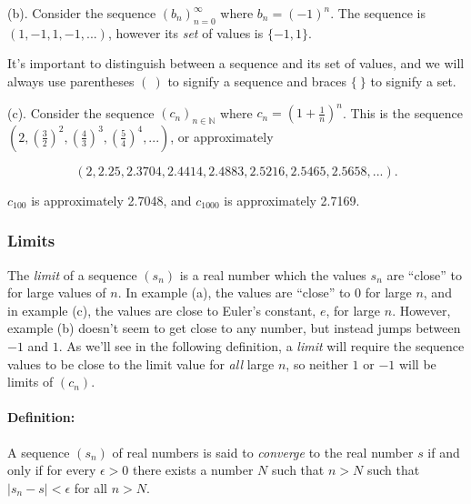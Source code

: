 \documentclass[]{article}
\begin{document}
(b). Consider the sequence $(b_n)_{n = 0}^{\infty}$ where
$b_n = (-1)^n$. The sequence is $(1,-1,1,-1,...)$, however its
\emph{set} of values is $\{-1,1\}$.

It's important to distinguish between a sequence and its set of values,
and we will always use parentheses $( \ )$ to signify a sequence and
braces $\{ \ \}$ to signify a set.

(c). Consider the sequence $(c_n)_{n \in \mathbb{N}}$ where
$c_n = (1 + \frac{1}{n})^n$. This is the sequence
$(2, (\frac{3}{2})^2, (\frac{4}{3})^3, (\frac{5}{4})^4, ...)$, or
approximately

\[ (2, 2.25, 2.3704, 2.4414, 2.4883, 2.5216, 2.5465, 2.5658, ...). \]

$c_{100}$ is approximately 2.7048, and $c_{1000}$ is approximately
2.7169.

\subsubsection{Limits}

The \emph{limit} of a sequence $(s_n)$ is a real number which the values
$s_n$ are ``close'' to for large values of $n$. In example (a), the
values are ``close'' to 0 for large $n$, and in example (c), the values
are close to Euler's constant, $e$, for large $n$. However, example (b)
doesn't seem to get close to any number, but instead jumps between $-1$
and $1$. As we'll see in the following definition, a \emph{limit} will
require the sequence values to be close to the limit value for
\emph{all} large $n$, so neither $1$ or $-1$ will be limits of $(c_n)$.

\paragraph{Definition:}

A sequence $(s_n)$ of real numbers is said to \emph{converge} to the
real number $s$ if and only if for every $\epsilon > 0$ there exists a
number $N$ such that $n>N$ such that $\vert s_n - s\vert  < \epsilon$
for all $n > N$.
\end{document}
